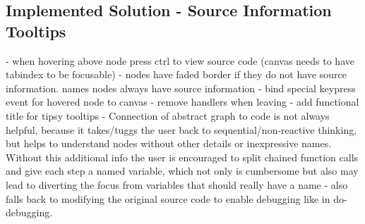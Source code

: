 			
	\subsection{Implemented Solution - Source Information Tooltips}
	- when hovering above node press ctrl to view source code (canvas needs to have tabindex to be focusable)
	- nodes have faded border if they do not have source information. names nodes always have source information
	- bind special keypress event for hovered node to canvas
	- remove handlers when leaving
	- add functional title for tipsy tooltips
	- Connection of abstract graph to code is not always helpful, because it takes/tuggs the user back to sequential/non-reactive thinking, but helps to understand nodes without other details or inexpressive names. Without this additional info the user is encouraged to split chained function calls and give each step a named variable, which not only is cumbersome but also may lead to diverting the focus from variables that should really have a name - also falls back to modifying the original source code to enable debugging like in do-debugging.
	
